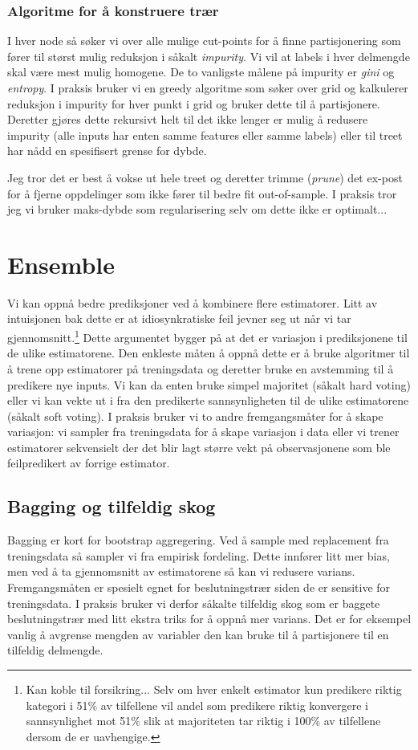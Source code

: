 \subsubsection{Algoritme for å konstruere trær}
I hver node så søker vi over alle mulige cut-points for å finne partisjonering som fører til størst mulig reduksjon i såkalt \textit{impurity}. Vi vil at labels i hver delmengde skal være mest mulig homogene. De to vanligste målene på impurity er \textit{gini} og \textit{entropy}. I praksis bruker vi en greedy algoritme som søker over grid og kalkulerer reduksjon i impurity for hver punkt i grid og bruker dette til å partisjonere. Deretter gjøres dette rekursivt helt til det ikke lenger er mulig å redusere impurity (alle inputs har enten samme features eller samme labels) eller til treet har nådd en spesifisert grense for dybde.

Jeg tror det er best å vokse ut hele treet og deretter trimme (\textit{prune}) det ex-post for å fjerne oppdelinger som ikke fører til bedre fit out-of-sample. I praksis tror jeg vi bruker maks-dybde som regularisering selv om dette ikke er optimalt...
\section{Ensemble}
Vi kan oppnå bedre prediksjoner ved å kombinere flere estimatorer. Litt av intuisjonen bak dette er at idiosynkratiske feil jevner seg ut når vi tar gjennomsnitt.\footnote{Kan koble til forsikring... Selv om hver enkelt estimator kun predikere riktig kategori i 51\% av tilfellene vil andel som predikere riktig konvergere i sannsynlighet mot 51\% slik at majoriteten tar riktig i 100\% av tilfellene dersom de er uavhengige.} Dette argumentet bygger på at det er variasjon i prediksjonene til de ulike estimatorene. Den enkleste måten å oppnå dette er å bruke algoritmer til å trene opp estimatorer på treningsdata og deretter bruke en avstemming til å predikere nye inputs. Vi kan da enten bruke simpel majoritet (såkalt hard voting) eller vi kan vekte ut i fra den predikerte sannsynligheten til de ulike estimatorene (såkalt soft voting). I praksis bruker vi to andre fremgangsmåter for å skape variasjon: vi sampler fra treningsdata for å skape variasjon i data eller vi trener estimatorer sekvensielt der det blir lagt større vekt på observasjonene som ble feilpredikert av forrige estimator.
\subsection{Bagging og tilfeldig skog}
Bagging er kort for bootstrap aggregering. Ved å sample med replacement fra treningsdata så sampler vi fra empirisk fordeling. Dette innfører litt mer bias, men ved å ta gjennomsnitt av estimatorene så kan vi redusere varians. Fremgangsmåten er spesielt egnet for beslutningstrær siden de er sensitive for treningsdata. I praksis bruker vi derfor såkalte tilfeldig skog som er baggete beslutningstrær med litt ekstra triks for å oppnå mer varians. Det er for eksempel vanlig å avgrense mengden av variabler den kan bruke til å partisjonere til en tilfeldig delmengde.

